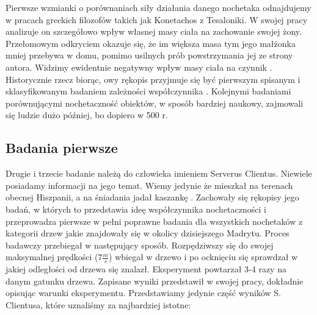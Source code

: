 Pierwsze wzmianki o porównaniach siły działania danego nochetaka odnajdujemy w pracach greckich filozofów takich jak Konetachos z Tesaloniki. W swojej pracy  analizuje on szczegółowo wpływ własnej masy ciała na zachowanie swojej żony. Przełomowym odkryciem okazuje się, że im większa masa tym jego małżonka mniej przebywa w domu, pomimo usilnych prób powstrzymania jej ze strony autora. Widzimy ewidentnie negatywny wpływ masy ciała na czynnik \Wn. Historycznie rzecz biorąc, owy rękopis przyjmuje się być pierwszym spisanym i sklasyfikowanym badaniem zależności współczynnika \Wn. Kolejnymi badaniami porównującymi nochetaczność obiektów, w sposób bardziej naukowy, zajmowali się ludzie dużo później, bo dopiero w 500 r. 
\subsection{Badania pierwsze}
    Drugie i trzecie badanie należą do człowieka imieniem Serverus Clientus. Niewiele posiadamy informacji na jego temat. Wiemy jedynie że mieszkał na terenach obecnej Hiszpanii, a na śniadania jadał kaszankę . Zachowały się rękopisy jego badań, w których to przedstawia ideę współczynnika nochetaczności i przeprowadza pierwsze w pełni poprawne badania dla wszystkich nochetaków z kategorii drzew jakie znajdowały się w okolicy dzisiejszego Madrytu. Proces badawczy przebiegał w następujący sposób. Rozpędziwszy się do swojej maksymalnej prędkości ($7\frac{m}{s}$) wbiegał w drzewo i po ocknięciu się sprawdzał w jakiej odległości od drzewa się znalazł. Eksperyment powtarzał 3-4 razy na danym gatunku drzewa. Zapisane wyniki przedstawił w swojej pracy, dokładnie opisując warunki eksperymentu. Przedstawiamy jedynie część wyników S. Clientusa, które uznaliśmy za najbardziej istotne:
